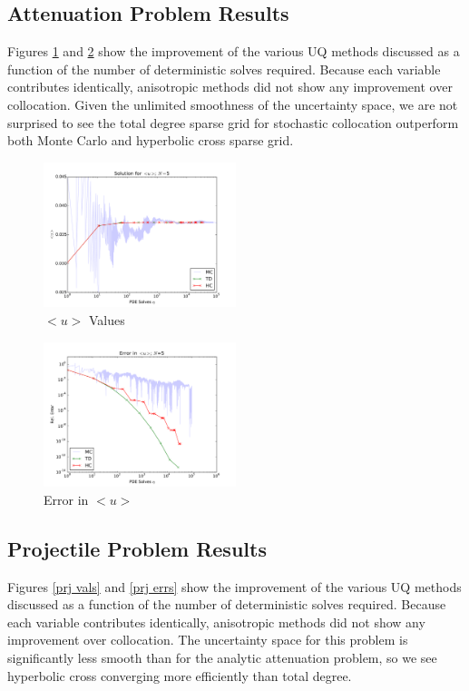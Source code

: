 \documentclass{mc2015}
\begin{document}
\subsection{Attenuation Problem Results}
Figures \ref{atn vals} and \ref{atn errs} show the improvement of the various UQ methods discussed as a function of the number of deterministic solves required.  Because each variable contributes identically, anisotropic methods did not show any improvement over collocation.  Given the unlimited smoothness of the uncertainty space, we are not surprised to see the total degree sparse grid for stochastic collocation outperform both Monte Carlo and hyperbolic cross sparse grid.
\begin{figure}[H]
    \centering
      \includegraphics[width=0.5\textwidth]{../graphics/attenuate_N5_soln}
      \caption{$<u>$ Values}
      \label{atn vals}
\end{figure}
\begin{figure}[H]
\centering
      \includegraphics[width=0.5\textwidth]{../graphics/attenuate_N5_conv}
      \caption{Error in $<u>$}
      \label{atn errs}
  \end{figure}

\subsection{Projectile Problem Results}
Figures \ref{prj vals} and \ref{prj errs} show the improvement of the various UQ methods discussed as a function of the number of deterministic solves required.  Because each variable contributes identically, anisotropic methods did not show any improvement over collocation.  The uncertainty space for this problem is significantly less smooth than for the analytic attenuation problem, so we see hyperbolic cross converging more efficiently than total degree.  \\
\end{document}
